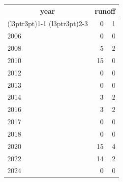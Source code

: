 \footnotesize\begin{tabular}[t]{lrr}
\toprule
\multicolumn{1}{c}{year} & \multicolumn{2}{c}{runoff} \\
\cmidrule(l{3pt}r{3pt}){1-1} \cmidrule(l{3pt}r{3pt}){2-3}
  & 0 & 1\\
\midrule
2006 & 0 & 0\\
2008 & 5 & 2\\
2010 & 15 & 0\\
2012 & 0 & 0\\
2013 & 0 & 0\\
2014 & 3 & 2\\
2016 & 3 & 2\\
2017 & 0 & 0\\
2018 & 0 & 0\\
2020 & 15 & 4\\
2022 & 14 & 2\\
2024 & 0 & 0\\
\bottomrule
\end{tabular}
